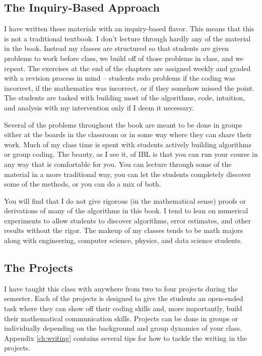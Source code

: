 \documentclass[
]{book}
\theoremstyle{definition}
\theoremstyle{definition}
\theoremstyle{definition}
\theoremstyle{remark}
\begin{document}
\hypertarget{the-inquiry-based-approach-1}{%
\subsection*{The Inquiry-Based Approach}\label{the-inquiry-based-approach-1}}

I have written these materials with an inquiry-based flavor. This means
that this is not a traditional textbook. I don't lecture through hardly
any of the material in the book. Instead my classes are structured so
that students are given problems to work before class, we build off of
those problems in class, and we repeat. The exercises at the end of the
chapters are assigned weekly and graded with a revision process in mind
-- students redo problems if the coding was incorrect, if the
mathematics was incorrect, or if they somehow missed the point. The
students are tasked with building most of the algorithms, code,
intuition, and analysis with my intervention only if I deem it
necessary.

Several of the problems throughout the book are meant to be done in
groups either at the boards in the classroom or in some way where they
can share their work. Much of my class time is spent with students
actively building algorithms or group coding. The beauty, as I see it,
of IBL is that you can run your course in any way that is comfortable
for you. You can lecture through some of the material in a more
traditional way, you can let the students completely discover some of
the methods, or you can do a mix of both.

You will find that I do not give rigorous (in the mathematical sense)
proofs or derivations of many of the algorithms in this book. I tend to
lean on numerical experiments to allow students to discover algorithms,
error estimates, and other results without the rigor. The makeup of my
classes tends to be math majors along with engineering, computer
science, physics, and data science students.

\hypertarget{the-projects}{%
\subsection*{The Projects}\label{the-projects}}

I have taught this class with anywhere from two to four projects during
the semester. Each of the projects is designed to give the students an
open-ended task where they can show off their coding skills and, more
importantly, build their mathematical communication skills. Projects can
be done in groups or individually depending on the background and group
dynamics of your class. Appendix \ref{ch:writing} contains several tips for how to tackle the writing in the projects.
\end{document}
